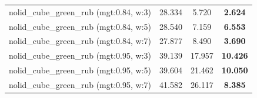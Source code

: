\begin{table}[H]
{\begin{tabular}{l ccc}
        nolid\_cube\_green\_rub (mgt:0.84, w:3) & 28.334 & 5.720 & \textbf{2.624} \\
        nolid\_cube\_green\_rub (mgt:0.84, w:5) & 28.540 & 7.159 & \textbf{6.553} \\
        nolid\_cube\_green\_rub (mgt:0.84, w:7) & 27.877 & 8.490 & \textbf{3.690} \\
        nolid\_cube\_green\_rub (mgt:0.95, w:3) & 39.139 & 17.957 & \textbf{10.426} \\
        nolid\_cube\_green\_rub (mgt:0.95, w:5) & 39.604 & 21.462 & \textbf{10.050} \\
        nolid\_cube\_green\_rub (mgt:0.95, w:7) & 41.582 & 26.117 & \textbf{8.385} \\
        \bottomrule
    \end{tabular}
    }
\end{table}



\vspace{1cm}

\clearpage

